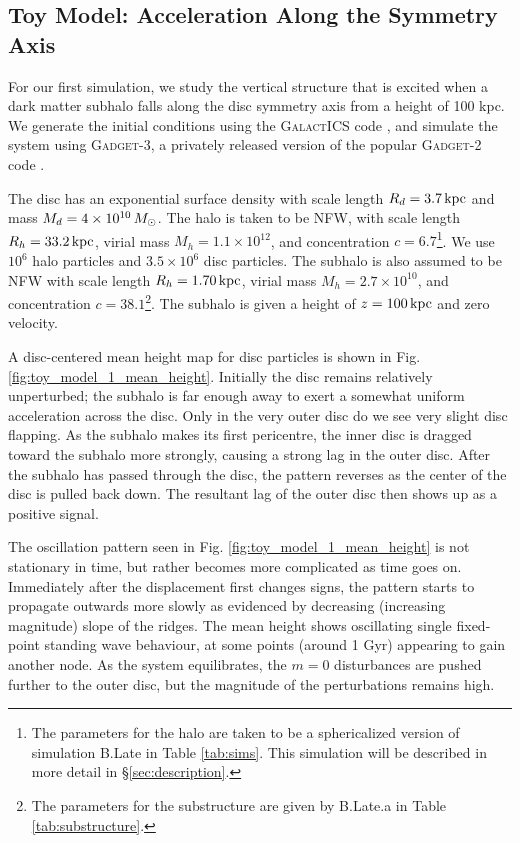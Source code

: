 \subsection{Toy Model: Acceleration Along the Symmetry Axis} \label{ssec:toy_model_1}


For our first simulation, we study the vertical structure that is excited when a dark matter subhalo falls along the disc symmetry axis from a height of 100 kpc.  We generate the initial conditions using  the \textsc{GalactICS} code \citep{KGGalactICSReference,WPDGalactICSReference}, and simulate the system using \textsc{Gadget-3}, a privately released version of the popular \textsc{Gadget-2} code \citep{GadgetCodePaper}.

The disc has an exponential surface density with scale length $R_d=3.7\,\text{kpc}$ and mass $M_d=4\times10^{10} \,M_\odot$. The halo is taken to be NFW, with scale length $R_h=33.2\,\text{kpc}$, virial mass $M_h=1.1\times10^{12}$, and concentration $c=6.7$\footnote{The parameters for the halo are taken to be a sphericalized version of simulation B.Late in Table \ref{tab:sims}. This simulation will be described in more detail in \S\ref{sec:description}.}. We use $10^6$ halo particles and $3.5 \times 10^{6}$ disc particles. The subhalo is also assumed to be NFW with scale length $R_h=1.70\,\text{kpc}$, virial mass $M_h=2.7\times10^{10}$, and concentration $c=38.1$\footnote{ The parameters for the substructure are given by B.Late.a in Table \ref{tab:substructure}.}. The subhalo is given a height of $z=100\,\text{kpc}$ and zero velocity.



A disc-centered mean height map for disc particles is shown in Fig. \ref{fig:toy_model_1_mean_height}. Initially the disc remains relatively unperturbed; the subhalo is far enough away to exert a somewhat uniform acceleration across the disc. Only in the very outer disc do we see very slight disc flapping. As the subhalo makes its first pericentre, the inner disc is dragged toward the subhalo more strongly, causing a strong lag in the outer disc. After the subhalo has passed through the disc, the pattern reverses as the center of the disc is pulled back down. The resultant lag of the outer disc then shows up as a positive signal.



The oscillation pattern seen in Fig. \ref{fig:toy_model_1_mean_height} is not stationary in time, but rather becomes more complicated as time goes on. Immediately after the displacement first changes signs, the pattern starts to propagate outwards more slowly as evidenced by decreasing (increasing magnitude) slope of the ridges. The mean height shows oscillating single fixed-point standing wave behaviour, at some points (around 1 Gyr) appearing to gain another node.  As the system equilibrates, the $m=0$ disturbances are pushed further to the outer disc, but the magnitude of the perturbations remains high.

